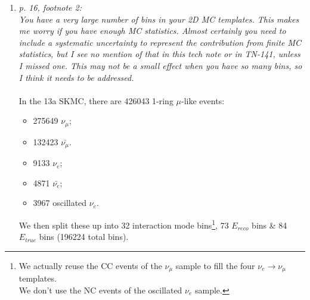 \begin{enumerate}
  \vspace{5 mm}
\item
  {\em
    p. 16, footnote 2:\\
    You have a very large number of bins in your 2D MC templates.  This makes me worry if you have enough MC statistics.
    Almost certainly you need to include a systematic uncertainty to represent the contribution from finite MC statistics,
    but I see no mention of that in this tech note or in TN-141, unless I missed one.
    This may not be a small effect when you have so many bins, so I think it needs to be addressed.
  }\\
  \\
  In the 13a SKMC, there are 426043 1-ring $\mu$-like events:
  \begin{itemize}
  \item 275649 $\nu_\mu$;
  \item 132423 $\bar{\nu_\mu}$.
  \item 9133 $\nu_e$;
  \item 4871 $\bar{\nu_e}$;
  \item 3967 oscillated $\nu_e$.
  \end{itemize}
  We then split these up into 32 interaction mode bins\footnote{
    We actually reuse the CC events of the $\nu_\mu$ sample to fill
    the four $\nu_e \rightarrow \nu_\mu$ templates.
    \\We don't use the NC events of the oscillated $\nu_e$ sample.
  }, 73 $E_{reco}$ bins \& 84 $E_{true}$ bins 
  (196224 total bins).


\end{enumerate}
